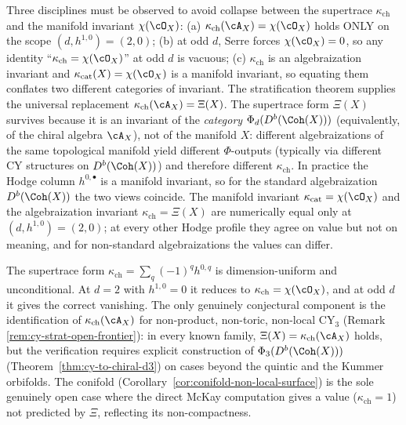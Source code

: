 \begin{remark}
\label{rem:algebraization-vs-manifold-invariants}
Three disciplines must be observed to avoid collapse between the
supertrace $\kappa_{\mathrm{ch}}$ and the manifold invariant
$\chi(\cO_X)$:
(a) $\kappa_{\mathrm{ch}}(\cA_X) = \chi(\cO_X)$ holds ONLY on the scope
$(d, h^{1,0}) = (2, 0)$;
(b) at odd $d$, Serre forces $\chi(\cO_X) = 0$, so any identity
``$\kappa_{\mathrm{ch}} = \chi(\cO_X)$'' at odd $d$ is vacuous;
(c) $\kappa_{\mathrm{ch}}$ is an algebraization invariant and
$\kappa_{\mathrm{cat}}(X) = \chi(\cO_X)$ is a manifold invariant, so
equating them conflates two different categories of invariant.
The stratification theorem supplies the universal replacement
$\kappa_{\mathrm{ch}}(\cA_X) = \Xi(X)$. The supertrace form
$\Xi(X)$ survives because it is an invariant of the \emph{category}
$\Phi_d(D^b(\Coh(X)))$ (equivalently, of the chiral algebra $\cA_X$),
not of the manifold $X$: different algebraizations of the same
topological manifold yield different $\Phi$-outputs (typically via
different CY structures on $D^b(\Coh(X))$) and therefore different
$\kappa_{\mathrm{ch}}$. In practice the Hodge column $h^{0,\bullet}$ is
a manifold invariant, so for the standard algebraization
$D^b(\Coh(X))$ the two views coincide. The manifold invariant
$\kappa_{\mathrm{cat}} = \chi(\cO_X)$ and the algebraization invariant
$\kappa_{\mathrm{ch}} = \Xi(X)$ are numerically equal only at
$(d, h^{1,0}) = (2, 0)$; at every other Hodge profile they agree on
value but not on meaning, and for non-standard algebraizations the
values can differ.
\end{remark}

\begin{remark}
\label{rem:strengthening-only}
The supertrace form
$\kappa_{\mathrm{ch}} = \sum_q (-1)^q h^{0,q}$ is
dimension-uniform and unconditional. At $d = 2$ with
$h^{1,0} = 0$ it reduces to $\kappa_{\mathrm{ch}} = \chi(\cO_X)$,
and at odd $d$ it gives the correct vanishing. The only genuinely
conjectural component is the identification of
$\kappa_{\mathrm{ch}}(\cA_X)$ for
non-product, non-toric, non-local CY$_3$ (Remark
\ref{rem:cy-strat-open-frontier}): in every known family,
$\Xi(X) = \kappa_{\mathrm{ch}}(\cA_X)$ holds, but the verification
requires explicit construction of $\Phi_3(D^b(\Coh(X)))$
(Theorem~\ref{thm:cy-to-chiral-d3}) on cases beyond the quintic and
the Kummer orbifolds. The conifold
(Corollary~\ref{cor:conifold-non-local-surface}) is the sole
genuinely open case where the direct McKay computation gives a value
($\kappa_{\mathrm{ch}} = 1$) not predicted by $\Xi$, reflecting its
non-compactness.
\end{remark}

